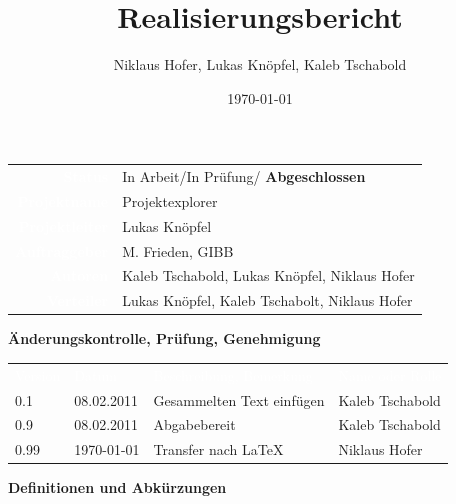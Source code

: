 \documentclass[10pt,paper=a4,final]{scrartcl}
\title{Realisierungsbericht}
\author{Niklaus Hofer, Lukas Kn\"opfel, Kaleb Tschabold}
\date{\today}
\begin{document}
\maketitle
\newpage
\begin{tabularx}{\textwidth}{ r X }	%
  \textcolor{white}{{\bf Status}}\cellcolor{blue!80!} & In Arbeit/In Prüfung/ {\bf Abgeschlossen}\cellcolor{blue!20!} \\
\textcolor{white}{{\bf Projektname}}\cellcolor{blue!80!} & Projektexplorer\cellcolor{blue!20!} \\
\textcolor{white}{{\bf Projektleiter}}\cellcolor{blue!80!} & Lukas Kn\"opfel\cellcolor{blue!20!} \\
\textcolor{white}{{\bf Auftraggeber}}\cellcolor{blue!80!} & M. Frieden, GIBB\cellcolor{blue!20!} \\
\textcolor{white}{{\bf Autoren}}\cellcolor{blue!80!} & Kaleb Tschabold, Lukas Kn\"opfel, Niklaus Hofer\cellcolor{blue!20!} \\
\textcolor{white}{{\bf Verteiler}}\cellcolor{blue!80!} & Lukas Knöpfel, Kaleb Tschabolt, Niklaus Hofer\cellcolor{blue!20!}
\end{tabularx}
\newline
\newline
\newline
{\bf Änderungskontrolle, Prüfung, Genehmigung}
\newline

\begin{tabularx}{\textwidth}{l l X X}
\textcolor{white}{Version}\cellcolor{blue!80!} & \textcolor{white}{Datum}\cellcolor{blue!80!} & \textcolor{white}{Beschreibung, Bemerkung}\cellcolor{blue!80!} & \textcolor{white}{Name oder Rolle}\cellcolor{blue!80!} \\
\cellcolor{blue!20!} 0.1& \cellcolor{blue!20!} 08.02.2011 & Gesammelten Text einfügen \cellcolor{blue!20!} & Kaleb Tschabold \cellcolor{blue!20!} \\
\cellcolor{blue!20!} 0.9& \cellcolor{blue!20!} 08.02.2011 & Abgabebereit \cellcolor{blue!20!} & Kaleb Tschabold \cellcolor{blue!20!} \\
\cellcolor{blue!20!} 0.99& \cellcolor{blue!20!} \today{} & Transfer nach \LaTeX \cellcolor{blue!20!} & Niklaus Hofer \cellcolor{blue!20!} \\
\end{tabularx}
\newline
\newline
\newline
{\bf Definitionen und Abkürzungen}
\newline
\end{document}
